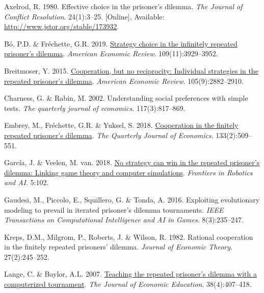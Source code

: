 \documentclass[11pt,preprint]{elsarticle}
\numberwithin{equation}{section}
\numberwithin{figure}{section}
\numberwithin{table}{section}
\newlength{\cslhangindent}
\newenvironment{CSLReferences}[2] %
{\begin{list}{}{%
	\setlength{\itemindent}{0pt}
	\setlength{\leftmargin}{0pt}
	\setlength{\parsep}{0pt}
	\ifodd #1
	\setlength{\leftmargin}{\cslhangindent}
	\setlength{\itemindent}{-1\cslhangindent}
	\fi
	\setlength{\itemsep}{#2\baselineskip}}}
{\end{list}}
\begin{document}
\label{refs}
\begin{CSLReferences}{1}{1}
Axelrod, R. 1980. Effective choice in the prisoner's dilemma. \emph{The
Journal of Conflict Resolution}. 24(1):3--25. {[}Online{]}, Available:
\url{http://www.jstor.org/stable/173932}.

Bó, P.D. \& Fréchette, G.R. 2019.
\href{https://doi.org/10.1257/aer.20181480}{Strategy choice in the
infinitely repeated prisoner's dilemma}. \emph{American Economic
Review}. 109(11):3929--3952.

Breitmoser, Y. 2015.
\href{https://doi.org/10.1257/aer.20130675}{Cooperation, but no
reciprocity: Individual strategies in the repeated prisoner's dilemma}.
\emph{American Economic Review}. 105(9):2882--2910.

Charness, G. \& Rabin, M. 2002. Understanding social preferences with
simple tests. \emph{The quarterly journal of economics}.
117(3):817--869.

Embrey, M., Fréchette, G.R. \& Yuksel, S. 2018.
\href{https://doi.org/10.1093/qje/qjx033}{Cooperation in the finitely
repeated prisoner's dilemma}. \emph{The Quarterly Journal of Economics}.
133(2):509--551.

García, J. \& Veelen, M. van. 2018.
\href{https://doi.org/10.3389/frobt.2018.00102}{No strategy can win in
the repeated prisoner's dilemma: Linking game theory and computer
simulations}. \emph{Frontiers in Robotics and AI}. 5:102.

Gaudesi, M., Piccolo, E., Squillero, G. \& Tonda, A. 2016. Exploiting
evolutionary modeling to prevail in iterated prisoner's dilemma
tournaments. \emph{IEEE Transactions on Computational Intelligence and
AI in Games}. 8(3):235--247.

Kreps, D.M., Milgrom, P., Roberts, J. \& Wilson, R. 1982. Rational
cooperation in the finitely repeated prisoners' dilemma. \emph{Journal
of Economic Theory}. 27(2):245--252.

Lange, C. \& Baylor, A.L. 2007.
\href{https://doi.org/10.3200/JECE.38.4.407-418}{Teaching the repeated
prisoner's dilemma with a computerized tournament}. \emph{The Journal of
Economic Education}. 38(4):407--418.


\end{CSLReferences}
\end{document}
